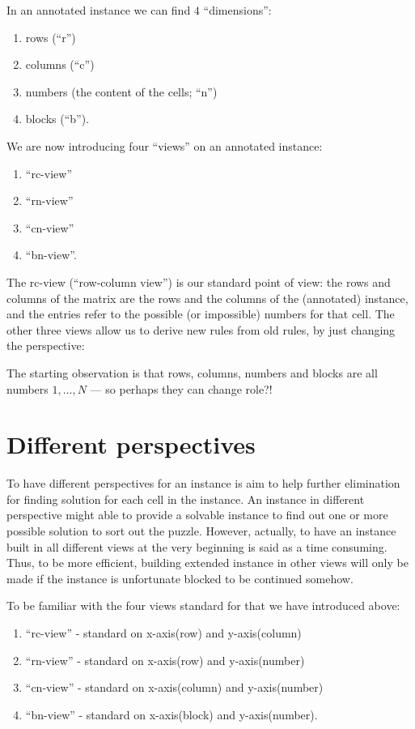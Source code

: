 \documentclass[11pt]{report}
\begin{document}
In an annotated instance we can find $4$ ``dimensions'':
\begin{enumerate}
\item rows (``r'')
\item columns (``c'')
\item numbers (the content of the cells; ``n'')
\item blocks (``b'').
\end{enumerate}
We are now introducing four ``views'' on an annotated instance:
\begin{enumerate}
\item ``rc-view''
\item ``rn-view''
\item ``cn-view''
\item ``bn-view''.
\end{enumerate}
The rc-view (``row-column view'') is our standard point of view: the rows and columns of the matrix are the rows and the columns of the (annotated) instance, and the entries refer to the possible (or impossible) numbers for that cell. The other three views allow us to derive new rules from old rules, by just changing the perspective:
\begin{center}
The starting observation is that rows, columns, numbers and blocks are all numbers $1,\dots,N$ --- so perhaps they can change role?!
\end{center}




\section{Different  perspectives}
\label{sec:Differentperspectives}

To have different perspectives for an instance is aim to help further elimination for finding solution for each cell in the instance. An instance in different perspective might able to provide a solvable instance to find out one or more possible solution to sort out the puzzle. However, actually, to have an instance built in all different views at the very beginning is said as a time consuming. Thus, to be more efficient, building extended instance in other views will only be made if the instance is unfortunate blocked to be continued somehow.

To be familiar with the four views standard for that we have introduced above:
\begin{enumerate}
\item ``rc-view'' - standard on x-axis(row) and y-axis(column)
\item ``rn-view'' - standard on x-axis(row) and y-axis(number)
\item ``cn-view'' - standard on x-axis(column) and y-axis(number)
\item ``bn-view'' - standard on x-axis(block) and y-axis(number).
\end{enumerate}
\end{document}
